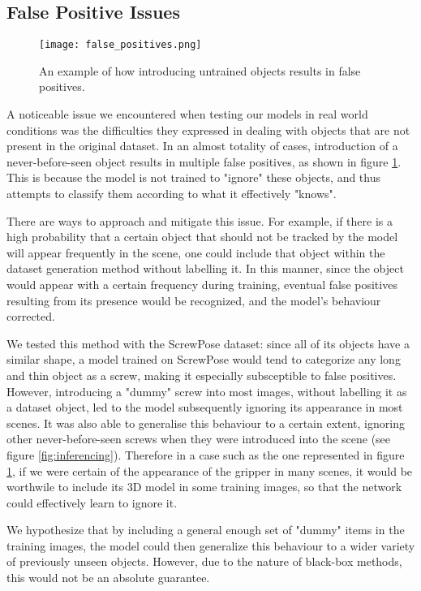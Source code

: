 \subsection{False Positive Issues}
\label{false_positives_issue}

\begin{figure}[ht]
    \texttt{[image: false\_positives.png]}
    \caption{An example of how introducing untrained objects results in false positives.}
    \label{false_positives}
\end{figure}

A noticeable issue we encountered when testing our models in real world conditions was the difficulties they expressed in dealing with objects that are not present in the original dataset. In an almost totality of cases, introduction of a never-before-seen object results in multiple false positives, as shown in figure \ref{false_positives}. This is because the model is not trained to "ignore" these objects, and thus attempts to classify them according to what it effectively "knows".

There are ways to approach and mitigate this issue. For example, if there is a high probability that a certain object that should not be tracked by the model will appear frequently in the scene, one could include that object within the dataset generation method without labelling it. In this manner, since the object would appear with a certain frequency during training, eventual false positives resulting from its presence would be recognized, and the model's behaviour corrected.

We tested this method with the ScrewPose dataset: since all of its objects have a similar shape, a model trained on ScrewPose would tend to categorize any long and thin object as a screw, making it especially subsceptible to false positives. However, introducing a "dummy" screw into most images, without labelling it as a dataset object, led to the model subsequently ignoring its appearance in most scenes. It was also able to generalise this behaviour to a certain extent, ignoring other never-before-seen screws when they were introduced into the scene (see figure \ref{fig:inferencing}). Therefore in a case such as the one represented in figure \ref{false_positives}, if we were certain of the appearance of the gripper in many scenes, it would be worthwile to include its 3D model in some training images, so that the network could effectively learn to ignore it.

We hypothesize that by including a general enough set of "dummy" items in the training images, the model could then generalize this behaviour to a wider variety of previously unseen objects. However, due to the nature of black-box methods, this would not be an absolute guarantee.

